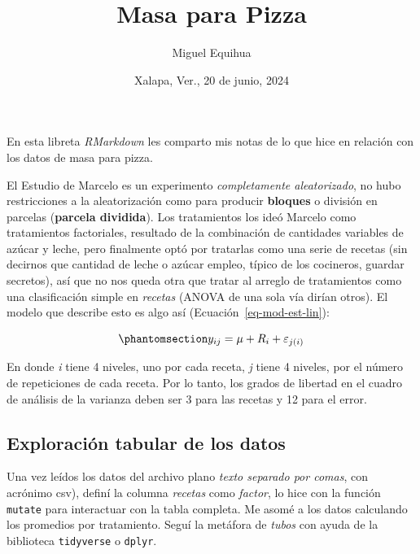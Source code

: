 \documentclass[
  letterpaper,
  DIV=11,
  numbers=noendperiod]{scrartcl}
\title{Masa para Pizza}
\author{Miguel Equihua}
\date{Xalapa, Ver., 20 de junio, 2024}
\renewcommand*\contentsname{Tabla de contenidos}
\newcommand\contentsname{Tabla de contenidos}
\begin{document}
\maketitle

\renewcommand*\contentsname{Tabla de contenidos}
{
\hypersetup{linkcolor=}
\setcounter{tocdepth}{3}
\tableofcontents
}
\listoftables
En esta libreta \emph{RMarkdown} les comparto mis notas de lo que hice
en relación con los datos de masa para pizza.

El Estudio de Marcelo es un experimento \emph{completamente
aleatorizado}, no hubo restricciones a la aleatorización como para
producir \textbf{bloques} o división en parcelas (\textbf{parcela
dividida}). Los tratamientos los ideó Marcelo como tratamientos
factoriales, resultado de la combinación de cantidades variables de
azúcar y leche, pero finalmente optó por tratarlas como una serie de
recetas (sin decirnos que cantidad de leche o azúcar empleo, típico de
los cocineros, guardar secretos), así que no nos queda otra que tratar
al arreglo de tratamientos como una clasificación simple en
\emph{recetas} (ANOVA de una sola vía dirían otros). El modelo que
describe esto es algo así (Ecuación~\ref{eq-mod-est-lin}):

\begin{equation}\phantomsection\label{eq-mod-est-lin}{
y_{ij} = \mu + R_i + \varepsilon_{j(i)}
}\end{equation}

En donde \emph{i} tiene 4 niveles, uno por cada receta, \emph{j} tiene 4
niveles, por el número de repeticiones de cada receta. Por lo tanto, los
grados de libertad en el cuadro de análisis de la varianza deben ser 3
para las recetas y 12 para el error.

\subsection{Exploración tabular de los
datos}\label{exploraciuxf3n-tabular-de-los-datos}

Una vez leídos los datos del archivo plano \emph{texto separado por
comas}, con acrónimo csv), definí la columna \emph{recetas} como
\emph{factor}, lo hice con la función \texttt{mutate} para interactuar
con la tabla completa. Me asomé a los datos calculando los promedios por
tratamiento. Seguí la metáfora de \emph{tubos} con ayuda de la
biblioteca \texttt{tidyverse} o \texttt{dplyr}.
\end{document}
